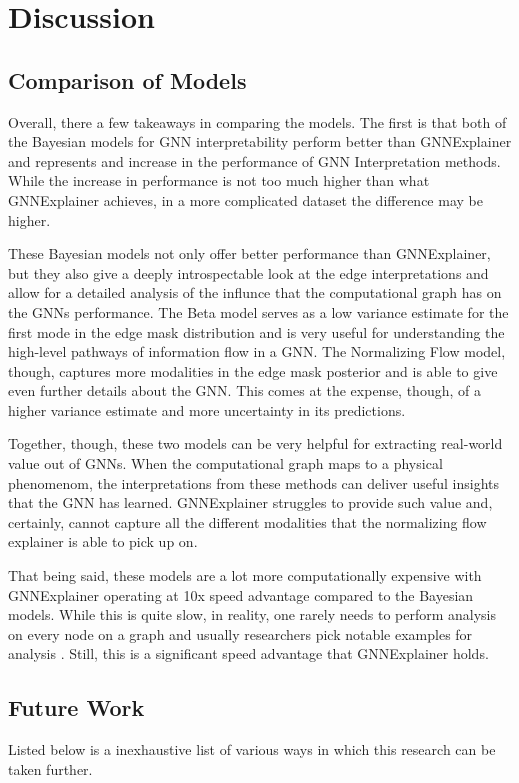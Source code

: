 \section{Discussion}

\subsection{Comparison of Models}
Overall, there a few takeaways in comparing the models. The first is that both of the Bayesian models for GNN interpretability perform better than GNNExplainer and represents and increase in the performance of GNN Interpretation methods. While the increase in performance is not too much higher than what GNNExplainer achieves, in a more complicated dataset the difference may be higher.

These Bayesian models not only offer better performance than GNNExplainer, but they also give a deeply introspectable look at the edge interpretations and allow for a detailed analysis of the influnce that the computational graph has on the GNNs performance. The Beta model serves as a low variance estimate for the first mode in the edge mask distribution and is very useful for understanding the high-level pathways of information flow in a GNN. The Normalizing Flow model, though, captures more modalities in the edge mask posterior and is able to give even further details about the GNN. This comes at the expense, though, of a higher variance estimate and more uncertainty in its predictions. 

Together, though, these two models can be very helpful for extracting real-world value out of GNNs. When the computational graph maps to a physical phenomenom, the interpretations from these methods can deliver useful insights that the GNN has learned. GNNExplainer struggles to provide such value and, certainly, cannot capture all the different modalities that the normalizing flow explainer is able to pick up on.

That being said, these models are a lot more computationally expensive with GNNExplainer operating at 10x speed advantage compared to the Bayesian models. While this is quite slow, in reality, one rarely needs to perform analysis on every node on a graph and usually researchers pick notable examples for analysis \cite{bigness_integrating_2021}. Still, this is a significant speed advantage that GNNExplainer holds. 

\subsection{Future Work}
Listed below is a inexhaustive list of various ways in which this research can be taken further. 

